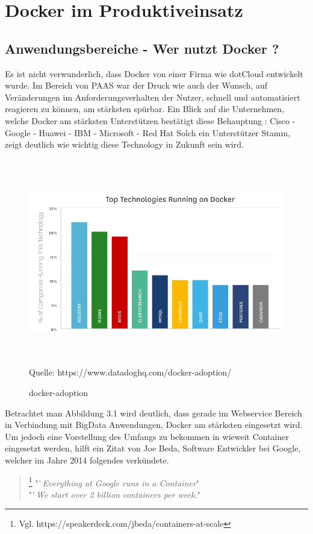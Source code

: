\documentclass[12pt,toc=bib,toc=listof]{scrreprt}
\begin{document}

\chapter{Docker im Produktiveinsatz}
\section{Anwendungsbereiche - Wer nutzt Docker ?}
Es ist nicht verwunderlich, dass Docker von einer Firma wie dotCloud entwickelt wurde.
Im Bereich von PAAS war der Druck wie auch der Wunsch, auf Veränderungen im Anforderungsverhalten der Nutzer, schnell und automatisiert reagieren zu können, am stärksten spürbar. 
Ein Blick auf die Unternehmen, welche Docker am stärksten Unterstützen bestätigt diese Behauptung :
Cisco - Google - Huawei - IBM - Microsoft - Red Hat
Solch ein Unterstützer Stamm, zeigt deutlich wie wichtig diese Technology in Zukunft sein wird.

\begin{figure}
	\centering
	\caption{docker-adoption}
	\includegraphics[width=15cm, height=9cm, scale=0.3]{docker-adoption.png}
	Quelle: https://www.datadoghq.com/docker-adoption/
\end{figure}

Betrachtet man Abbildung 3.1 wird deutlich, dass gerade im Webservice Bereich in Verbindung mit BigData Anwendungen, Docker am stärksten eingesetzt wird.
Um jedoch eine Vorstellung des Umfangs zu bekommen in wieweit Container eingesetzt werden, hilft ein Zitat von Joe Beda, Software Entwickler bei Google, welcher im Jahre 2014 folgendes verkündete.

\begin{quote}
	\footnote[1]{Vgl. https://speakerdeck.com/jbeda/containers-at-scale}
	"`\textit{Everything at Google runs in a Container}"\\
	"`\textit{We start over 2 billion containers per week.}"
\end{quote}
\end{document}
